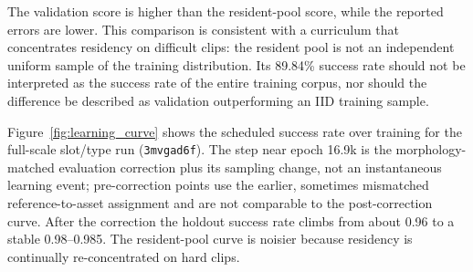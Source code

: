 The validation score is higher than the resident-pool score, while the
reported errors are lower. This comparison is consistent with a curriculum
that concentrates residency on difficult clips: the resident pool is not an
independent uniform sample of the training distribution. Its 89.84\% success
rate should not be interpreted as the success rate of the entire training
corpus, nor should the difference be described as validation outperforming
an IID training sample.

Figure~\ref{fig:learning_curve} shows the scheduled success rate over training
for the full-scale slot/type run (\texttt{3mvgad6f}). The step near epoch 16.9k is the morphology-matched
evaluation correction plus its sampling change, not an instantaneous learning
event; pre-correction points use the earlier, sometimes mismatched
reference-to-asset assignment and are not comparable to the post-correction
curve. After the correction the holdout success rate climbs from about
0.96 to a stable 0.98--0.985. The resident-pool curve is noisier because
residency is continually re-concentrated on hard clips.

